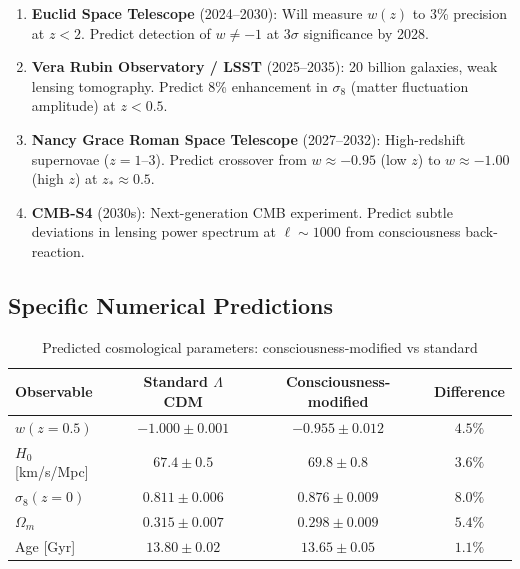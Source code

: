\begin{enumerate}
\item \textbf{Euclid Space Telescope} (2024--2030)\cite{euclid2011}: Will measure $w(z)$ to 3\% precision at $z < 2$. Predict detection of $w \neq -1$ at $3\sigma$ significance by 2028.

\item \textbf{Vera Rubin Observatory / LSST} (2025--2035)\cite{lsst2009}: 20 billion galaxies, weak lensing tomography. Predict 8\% enhancement in $\sigma_8$ (matter fluctuation amplitude) at $z < 0.5$.

\item \textbf{Nancy Grace Roman Space Telescope} (2027--2032)\cite{roman2015}: High-redshift supernovae ($z = 1\text{--}3$). Predict crossover from $w \approx -0.95$ (low $z$) to $w \approx -1.00$ (high $z$) at $z_* \approx 0.5$.

\item \textbf{CMB-S4} (2030s)\cite{cmbs4}: Next-generation CMB experiment. Predict subtle deviations in lensing power spectrum at $\ell \sim 1000$ from consciousness back-reaction.
\end{enumerate}

\subsection{Specific Numerical Predictions}

\begin{table}[h]
\centering
\begin{tabular}{lccc}
\toprule
\textbf{Observable} & \textbf{Standard $\Lambda$CDM} & \textbf{Consciousness-modified} & \textbf{Difference} \\
\midrule
$w(z=0.5)$ & $-1.000 \pm 0.001$ & $-0.955 \pm 0.012$ & $4.5\%$ \\
$H_0$ [km/s/Mpc] & $67.4 \pm 0.5$ & $69.8 \pm 0.8$ & $3.6\%$ \\
$\sigma_8(z=0)$ & $0.811 \pm 0.006$ & $0.876 \pm 0.009$ & $8.0\%$ \\
$\Omega_m$ & $0.315 \pm 0.007$ & $0.298 \pm 0.009$ & $5.4\%$ \\
Age [Gyr] & $13.80 \pm 0.02$ & $13.65 \pm 0.05$ & $1.1\%$ \\
\bottomrule
\end{tabular}
\caption{Predicted cosmological parameters: consciousness-modified vs standard}
\label{tab:parameters-comparison}
\end{table}

